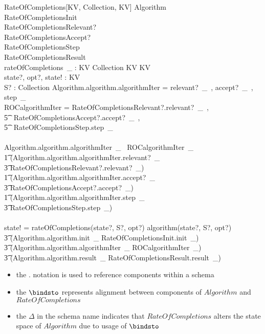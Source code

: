 \documentclass[../main.tex]{subfiles}
\begin{document}
\begin{schema}{\Delta RateOfCompletions[KV, Collection, KV]}
  Algorithm \\
  RateOfCompletionsInit \\
  RateOfCompletionsRelevant? \\
  RateOfCompletionsAccept? \\
  RateOfCompletionsStep \\
  RateOfCompletionsResult \\
  rateOfCompletions~\_ : KV \cross Collection \cross KV \surj KV \\
  state?, opt?, state! : KV \\
  S? : Collection
  \where
  Algorithm.algorithm.algorithmIter = \langle relevant?~\_~, accept?~\_~, step~\_ \rangle \\
  ROCalgorithmIter = \langle RateOfCompletionsRelevant?.relevant?~\_~, \\
  \t5 \ RateOfCompletionsAccept?.accept?~\_~, \\
  \t5 \ RateOfCompletionsStep.step~\_ \rangle \\ ~ \\

  Algorithm.algorithm.algorithmIter~\_~ \bindsto ROCalgorithmIter~\_~ \implies \\
  \t1 (Algorithm.algorithm.algorithmIter.relevant?~\_ \bindsto \\
  \t3 RateOfCompletionsRelevant?.relevant?~\_)  ~\land \\
  \t1 (Algorithm.algorithm.algorithmIter.accept?~\_ \bindsto \\
  \t3 RateOfCompletionsAccept?.accept?~\_) ~\land \\
  \t1 (Algorithm.algorithm.algorithmIter.step~\_ \bindsto \\
  \t3 RateOfCompletionsStep.step~\_) \\ ~ \\

  state! = rateOfCompletions(state?, S?, opt?) \equiv algorithm(state?, S?, opt?) \iff \\
  \t3 (Algorithm.algorithm.init~\_ \bindsto RateOfCompletionsInit.init~\_) ~\land \\
  \t3 (Algorithm.algorithm.algorithmIter~\_ \bindsto ROCalgorithmIter~\_) ~ \land \\
  \t3 (Algorithm.algorithm.result~\_ \bindsto RateOfCompletionsResult.result~\_)
\end{schema}
\begin{itemize}
\item the $.$ notation is used to reference components within a schema
\item the $\bindsto$ represents alignment between components of $Algorithm$ and $RateOfCompletions$
\item the $\Delta$ in the schema name indicates that $RateOfCompletions$ alters the state space of $Algorithm$
  due to usage of $\bindsto$
\end{itemize}
\end{document}
